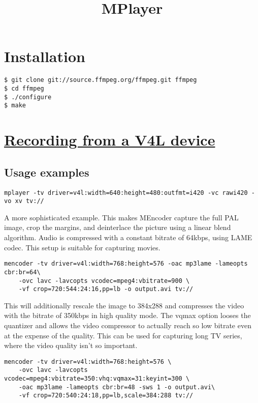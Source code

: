 \title{MPlayer}

\maketitle
\tableofcontents

\chapter{Installation}
\begin{verbatim}
$ git clone git://source.ffmpeg.org/ffmpeg.git ffmpeg
$ cd ffmpeg
$ ./configure
$ make
\end{verbatim}

\chapter{\href{http://www.mplayerhq.hu/DOCS/HTML/en/tv-input.html}{Recording from a V4L device}}

\section{Usage examples}

\begin{verbatim}
mplayer -tv driver=v4l:width=640:height=480:outfmt=i420 -vc rawi420 -vo xv tv://
\end{verbatim}

A more sophisticated example. This makes MEncoder capture the full PAL image, crop the margins, and deinterlace the picture using a linear blend algorithm. Audio is compressed with a constant bitrate of 64kbps, using LAME codec. This setup is suitable for capturing movies.

\begin{verbatim}
mencoder -tv driver=v4l:width=768:height=576 -oac mp3lame -lameopts cbr:br=64\
    -ovc lavc -lavcopts vcodec=mpeg4:vbitrate=900 \
    -vf crop=720:544:24:16,pp=lb -o output.avi tv://
\end{verbatim}

This will additionally rescale the image to 384x288 and compresses the video with the bitrate of 350kbps in high quality mode. The vqmax option looses the quantizer and allows the video compressor to actually reach so low bitrate even at the expense of the quality. This can be used for capturing long TV series, where the video quality isn't so important.

\begin{verbatim}
mencoder -tv driver=v4l:width=768:height=576 \
    -ovc lavc -lavcopts vcodec=mpeg4:vbitrate=350:vhq:vqmax=31:keyint=300 \
    -oac mp3lame -lameopts cbr:br=48 -sws 1 -o output.avi\
    -vf crop=720:540:24:18,pp=lb,scale=384:288 tv://
\end{verbatim}



